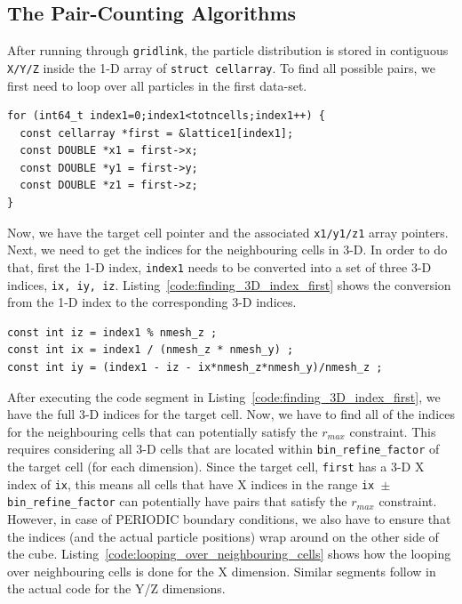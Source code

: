 \documentclass[12pt,titlepage]{article}
\newcommand{\rmax}{\ensuremath{{r_{max}}}\xspace}
\begin{document}
\subsection{The Pair-Counting Algorithms}
After running through \texttt{gridlink}, the particle distribution is stored in contiguous \texttt{X/Y/Z} inside the 1-D array of \texttt{struct cellarray}. To find all 
possible pairs, we first need to loop over all particles in the first data-set. 
\begin{lstlisting}[label={code:loop_over_first_cells},caption={Looping over all cells in the first data-set.}]
for (int64_t index1=0;index1<totncells;index1++) {
  const cellarray *first = &lattice1[index1];
  const DOUBLE *x1 = first->x;
  const DOUBLE *y1 = first->y;
  const DOUBLE *z1 = first->z;
}
\end{lstlisting}
Now, we have the target cell pointer and the associated \texttt{x1/y1/z1} array pointers. Next, we need to get the indices for the neighbouring cells in 3-D. In order to do that, first 
the 1-D index, \texttt{index1} needs to be converted into a set of three 3-D indices, \texttt{ix, iy, iz}. Listing~\ref{code:finding_3D_index_first} shows the conversion from 
the 1-D index to the corresponding 3-D indices. 
\begin{lstlisting}[label={code:finding_3D_index_first},caption={Reconstructing 3-D index for \texttt{first} cell in the first data-set.}]
const int iz = index1 % nmesh_z ;
const int ix = index1 / (nmesh_z * nmesh_y) ;
const int iy = (index1 - iz - ix*nmesh_z*nmesh_y)/nmesh_z ;
\end{lstlisting}
After executing the code segment in Listing~\ref{code:finding_3D_index_first}, we have the full 3-D indices for the target cell. Now, we have to find all of the indices 
for the neighbouring cells that can potentially satisfy the \rmax constraint. This requires considering all 3-D cells that are located within \texttt{bin\_refine\_factor} of 
the target cell (for each dimension). Since the target cell, \texttt{first} has a 3-D X index of \texttt{ix}, this means all cells that have X indices in the range 
\texttt{ix $\pm$ bin\_refine\_factor} can potentially have pairs that satisfy the \rmax constraint. However, in case of PERIODIC boundary conditions, we also have 
to ensure that the indices (and the actual particle positions) wrap around on the other side of the cube. Listing~\ref{code:looping_over_neighbouring_cells} shows 
how the looping over neighbouring cells is done for the X dimension. Similar segments follow in the actual code for the Y/Z dimensions. 
\end{document}
